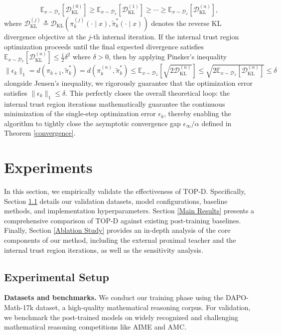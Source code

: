 \documentclass{article}
\theoremstyle{plain}
\theoremstyle{definition}
\theoremstyle{remark}
\begin{document}
\begin{equation}
	\mathbb{E}_{x\sim\mathcal{D}_x}\left[\mathcal{D}_{\mathrm{KL}}^{(0)}\right]\geq\mathbb{E}_{x\sim\mathcal{D}_x}\left[\mathcal{D}_{\mathrm{KL}}^{(1)}\right]\geq\cdots\geq\mathbb{E}_{x\sim\mathcal{D}_x}\left[\mathcal{D}_{\mathrm{KL}}^{(n)}\right],
\end{equation}
where $\mathcal{D}_{\mathrm{KL}}^{(j)} \triangleq \mathcal{D}_{\mathrm{KL}}(\pi_k^{(j)}(\cdot \mid x),\tilde{\pi}_k^*(\cdot \mid x))$ denotes the reverse KL divergence objective at the $j$-th internal iteration. If the internal trust region optimization proceeds until the final expected divergence satisfies $\mathbb{E}_{x \sim \mathcal{D}_x}\left[\mathcal{D}_{\mathrm{KL}}^{(n)}\right] \leq \frac{1}{2}\delta^2$ where $\delta>0$, then by applying Pinsker's inequality $\lVert\epsilon_{k}\rVert_1=d(\pi_{k+1},\tilde{\pi}_k^*)=d(\pi_k^{(n)}, \tilde{\pi}_k^*)\leq\mathbb{E}_{x \sim \mathcal{D}_x}\left[\sqrt{2\mathcal{D}_{\mathrm{KL}}^{(n)}}\right]\leq\sqrt{2\mathbb{E}_{x\sim\mathcal{D}_x}\left[\mathcal{D}_{\mathrm{KL}}^{(n)}\right]}\leq\delta$ alongside Jensen's inequality, we rigorously guarantee that the optimization error satisfies $\lVert\epsilon_k\rVert_1\leq\delta$. This perfectly closes the overall theoretical loop: the internal trust region iterations mathematically guarantee the continuous minimization of the single-step optimization error $\epsilon_k$, thereby enabling the algorithm to tightly close the asymptotic convergence gap $\epsilon_\infty/\alpha$ defined in Theorem \ref{convergence}.




\section{Experiments}
In this section, we empirically validate the effectiveness of TOP-D. Specifically, Section \ref{Experimental Setup} details our validation datasets, model configurations, baseline methods, and implementation hyperparameters. Section \ref{Main Results} presents a comprehensive comparison of TOP-D against existing post-training baselines. Finally, Section \ref{Ablation Study} provides an in-depth analysis of the core components of our method, including the external proximal teacher and the internal trust region iterations, as well as the sensitivity analysis.

\subsection{Experimental Setup}\label{Experimental Setup}
\textbf{Datasets and benchmarks.} We conduct our training phase using the DAPO-Math-17k \citep{yu2025dapo} dataset, a high-quality mathematical reasoning corpus. For validation, we benchmark the post-trained models on widely recognized and challenging mathematical reasoning competitions like AIME and AMC.
\end{document}
